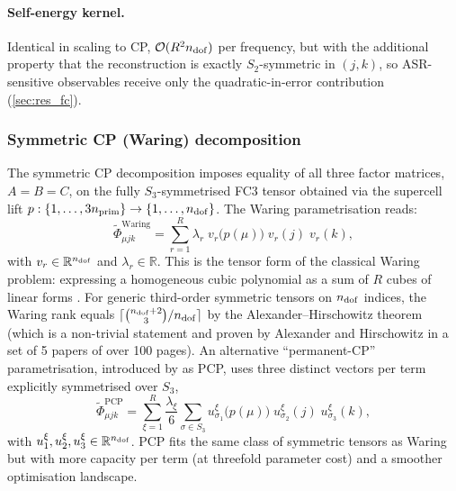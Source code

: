 \paragraph{Self-energy kernel.} Identical in scaling to CP, $\mathcal{O}(R^{2}n_{\mathrm{dof}})$ per frequency, but
with the additional property that the reconstruction is exactly $S_2$-symmetric in $(j,k)$, so
ASR-sensitive observables receive only the quadratic-in-error contribution
(\cref{sec:res_fc}).


\subsubsection{Symmetric CP (Waring) decomposition}
\label{sub:fc3_symcp}
The symmetric CP decomposition imposes equality of all three factor matrices, $A=B=C$, on the
fully $S_3$-symmetrised FC3 tensor obtained via the supercell lift
$p:\{1,\dots,3n_{\mathrm{prim}}\}\to\{1,\dots,n_{\mathrm{dof}}\}$. The Waring parametrisation reads:
\begin{equation}\label{eq:fc3_waring_ansatz}
    \tilde\Phi_{\mu j k}^{\mathrm{Waring}}
    = \sum_{r=1}^{R} \lambda_r\;
      v_r\!\bigl(p(\mu)\bigr)\; v_r(j)\; v_r(k),
\end{equation}
with $v_r\in\mathbb{R}^{n_{\mathrm{dof}}}$ and $\lambda_r\in\mathbb{R}$. This is the tensor form of the
classical Waring problem: expressing a homogeneous cubic polynomial as a sum of $R$ cubes of
linear forms \cite{brachat_symmetric_2010, comon_symmetric_2008, oeding_eigenvectors_2013}. For
generic third-order symmetric tensors on $n_{\mathrm{dof}}$ indices, the Waring rank equals
$\lceil\binom{n_{\mathrm{dof}}+2}{3}/n_{\mathrm{dof}}\rceil$ by the Alexander--Hirschowitz theorem
\cite{alexander_generic_1997} (which is a non-trivial statement and proven by Alexander and Hirschowitz
in a set of 5 papers of over 100 pages). An alternative ``permanent-CP'' parametrisation, introduced
by \citet{luo_tensor_2025} as PCP, uses three distinct vectors per term explicitly symmetrised
over $S_3$,
\begin{equation}\label{eq:fc3_pcp_ansatz}
    \tilde\Phi_{\mu j k}^{\mathrm{PCP}}
    = \sum_{\xi=1}^{R} \frac{\lambda_\xi}{6}
      \sum_{\sigma\in S_3}
      u^{\xi}_{\sigma_1}\!\bigl(p(\mu)\bigr)\;
      u^{\xi}_{\sigma_2}(j)\;
      u^{\xi}_{\sigma_3}(k),
\end{equation}
with $u^{\xi}_1, u^{\xi}_2, u^{\xi}_3\in\mathbb{R}^{n_{\mathrm{dof}}}$. PCP fits the same class of symmetric
tensors as Waring but with more capacity per term (at threefold parameter cost) and a smoother
optimisation landscape.

